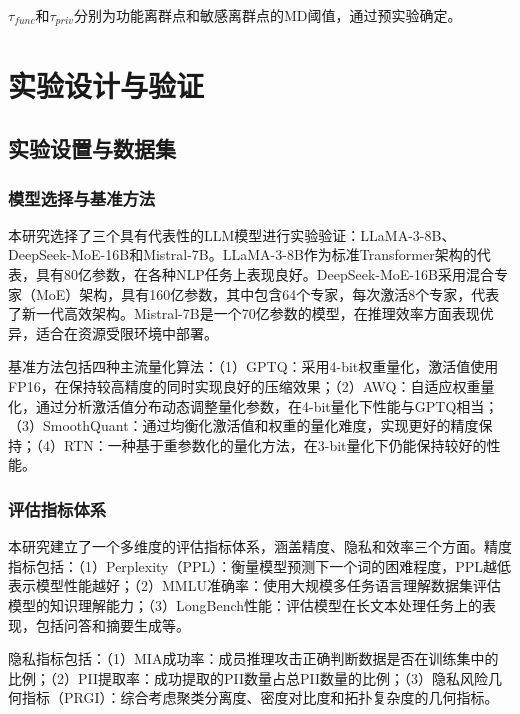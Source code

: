 $\tau_{func}$和$\tau_{priv}$分别为功能离群点和敏感离群点的MD阈值，通过预实验确定。

\section{实验设计与验证}

\subsection{实验设置与数据集}

\subsubsection{模型选择与基准方法}

本研究选择了三个具有代表性的LLM模型进行实验验证：LLaMA-3-8B、DeepSeek-MoE-16B和Mistral-7B。LLaMA-3-8B作为标准Transformer架构的代表，具有80亿参数，在各种NLP任务上表现良好。DeepSeek-MoE-16B采用混合专家（MoE）架构，具有160亿参数，其中包含64个专家，每次激活8个专家，代表了新一代高效架构。Mistral-7B是一个70亿参数的模型，在推理效率方面表现优异，适合在资源受限环境中部署。

基准方法包括四种主流量化算法：（1）GPTQ：采用4-bit权重量化，激活值使用FP16，在保持较高精度的同时实现良好的压缩效果；（2）AWQ：自适应权重量化，通过分析激活值分布动态调整量化参数，在4-bit量化下性能与GPTQ相当；（3）SmoothQuant：通过均衡化激活值和权重的量化难度，实现更好的精度保持；（4）RTN：一种基于重参数化的量化方法，在3-bit量化下仍能保持较好的性能。

\subsubsection{评估指标体系}

本研究建立了一个多维度的评估指标体系，涵盖精度、隐私和效率三个方面。精度指标包括：（1）Perplexity（PPL）：衡量模型预测下一个词的困难程度，PPL越低表示模型性能越好；（2）MMLU准确率：使用大规模多任务语言理解数据集评估模型的知识理解能力；（3）LongBench性能：评估模型在长文本处理任务上的表现，包括问答和摘要生成等。

隐私指标包括：（1）MIA成功率：成员推理攻击正确判断数据是否在训练集中的比例；（2）PII提取率：成功提取的PII数量占总PII数量的比例；（3）隐私风险几何指标（PRGI）：综合考虑聚类分离度、密度对比度和拓扑复杂度的几何指标。

